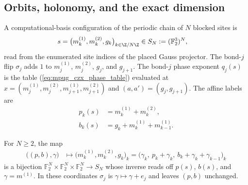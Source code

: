 \subsection{Orbits, holonomy, and the exact dimension}

\begin{definition}
    \label{def:mpug_czx_chain_labels}
    \leanok
    A computational-basis configuration of the periodic chain of $N$ blocked
    sites is
    \begin{align}
        s & =\bigl(m^{(1)}_k,m^{(2)}_k,g_k\bigr)_{k\in\Z/N\Z}\in S_N:=(\mathbb F_2^3)^N,
        \label{eq:mpug_czx_configuration}
    \end{align}
    read from the enumerated site indices of the placed Gauss projector. The
    bond-$j$ flip $\sigma_j$ adds $1$ to $m^{(1)}_j$, $m^{(2)}_j$, $g_j$, and
    $g_{j+1}$. The bond-$j$ phase exponent $q_j(s)$ is the table
    (\ref{eq:mpug_czx_phase_table}) evaluated at
    $x=(m^{(1)}_j,m^{(2)}_j,m^{(1)}_{j+1},m^{(2)}_{j+1})$ and
    $(a,a')=(g_j,g_{j+1})$. The affine labels are
    \begin{align}
        p_k(s) & =m^{(1)}_k+m^{(2)}_k,
        \label{eq:mpug_czx_p_label}            \\
        b_k(s) & =g_k+m^{(1)}_k+m^{(1)}_{k-1}.
        \label{eq:mpug_czx_b_label}
    \end{align}
\end{definition}

\begin{lemma}
    \label{thm:mpug_czx_orbit_classification}
    \leanok
    For $N\geq2$, the map
    \begin{align}
        \bigl((p,b),\gamma\bigr)
         & \longmapsto
        \bigl(m^{(1)}_k,m^{(2)}_k,g_k\bigr)_k
        =\bigl(\gamma_k,\ p_k+\gamma_k,\ b_k+\gamma_k+\gamma_{k-1}\bigr)_k
        \label{eq:mpug_czx_fiber_coordinates}
    \end{align}
    is a bijection $\mathbb F_2^N\times\mathbb F_2^N\times\mathbb F_2^N\to S_N$
    whose inverse reads off $p(s)$, $b(s)$, and $\gamma=m^{(1)}$. In these
    coordinates $\sigma_j$ is $\gamma\mapsto\gamma+e_j$ and leaves $(p,b)$
    unchanged.
\end{lemma}

